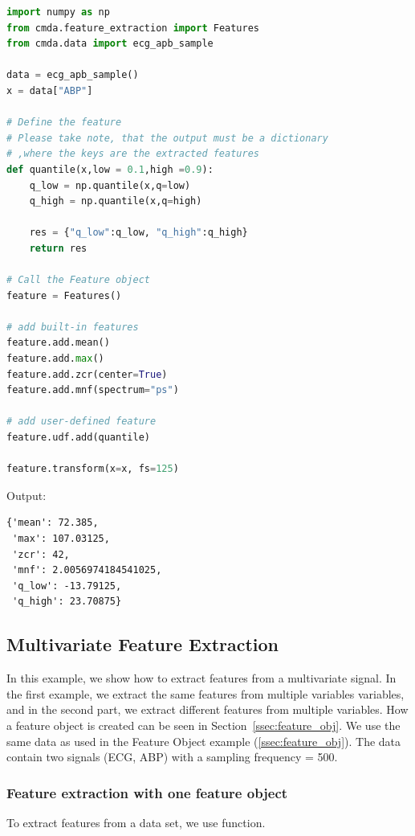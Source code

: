 \documentclass{article}
\begin{document}
\begin{lstlisting}[language=Python, caption=User-defined feature extraction]
import numpy as np
from cmda.feature_extraction import Features
from cmda.data import ecg_apb_sample

data = ecg_apb_sample()
x = data["ABP"]

# Define the feature
# Please take note, that the output must be a dictionary
# ,where the keys are the extracted features
def quantile(x,low = 0.1,high =0.9):
    q_low = np.quantile(x,q=low)
    q_high = np.quantile(x,q=high)
    
    res = {"q_low":q_low, "q_high":q_high}
    return res

# Call the Feature object
feature = Features()

# add built-in features
feature.add.mean()
feature.add.max()
feature.add.zcr(center=True)
feature.add.mnf(spectrum="ps")

# add user-defined feature
feature.udf.add(quantile)

feature.transform(x=x, fs=125)
\end{lstlisting}

Output:
\begin{lstlisting}[caption=User-defined feature extraction output]
{'mean': 72.385,
 'max': 107.03125,
 'zcr': 42,
 'mnf': 2.0056974184541025,
 'q_low': -13.79125,
 'q_high': 23.70875}
\end{lstlisting}

\subsection{Multivariate Feature Extraction}

In this example, we show how to extract features from a multivariate signal. In the first example, we extract the same features from multiple variables variables, and in the second part, we extract different features from multiple variables. How a feature object is created can be seen in Section~\ref{ssec:feature_obj}. We use the same data as used in the Feature Object example (\ref{ssec:feature_obj}). The data contain two signals (ECG, ABP) with a sampling frequency = 500.

\subsubsection{Feature extraction with one feature object}
To extract features from a data set, we use  function. 
\end{document}
